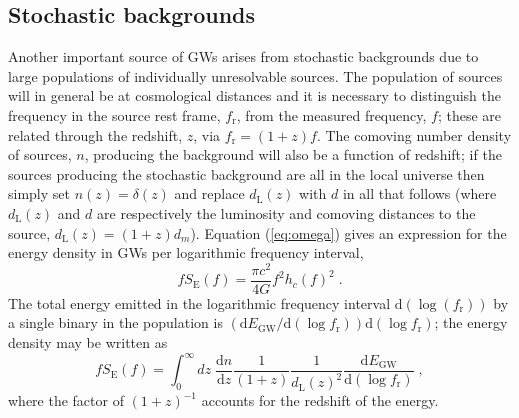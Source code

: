 \subsection{Stochastic backgrounds}\label{sec:stoch}
Another important source of GWs arises from stochastic backgrounds due to large populations of individually unresolvable sources. The population of sources will in general be at cosmological distances and it is necessary to distinguish the frequency in the source rest frame, $f_{\textrm{r}}$, from the measured frequency, $f$; these are related through the redshift, $z$, via $f_{\textrm{r}}=(1+z)f$. The comoving number density of sources, $n$, producing the background will also be a function of redshift; if the sources producing the stochastic background are all in the local universe then simply set $n(z)=\delta (z)$ and replace $d_{\textrm{L}}(z)$ with $d$ in all that follows (where $d_{\textrm{L}}(z)$ and $d$ are respectively the luminosity and comoving distances to the source, $d_{\textrm{L}}(z)=(1+z)d_{m}$). Equation (\ref{eq:omega}) gives an expression for the energy density in GWs per logarithmic frequency interval,
\begin{equation}\label{eq:stoch} fS_{\textrm{E}}(f)=\frac{\pi c^{2}}{4G}f^{2}h_{c}(f)^{2} \; . \end{equation}
The total energy emitted in the logarithmic frequency interval $\textrm{d}\left(\log (f_{\textrm{r}})\right)$ by a single binary in the population is $\left(\textrm{d}E_{\textrm{GW}}/\textrm{d}(\log f_{\textrm{r}})\right)\textrm{d}(\log f_{\textrm{r}})$; the energy density may be written as
\begin{equation}\label{eq:Phinney} fS_{\textrm{E}}(f)=\int_{0}^{\infty}dz\; \frac{\textrm{d}n}{\textrm{d}z}\frac{1}{(1+z)}\frac{1}{d_{\textrm{L}}(z)^{2}}\frac{\textrm{d}E_{\textrm{GW}}}{\textrm{d}\left(\log f_{\textrm{r}} \right)} \; , \end{equation}
where the factor of $\left( 1+z \right)^{-1}$ accounts for the redshift of the energy.

